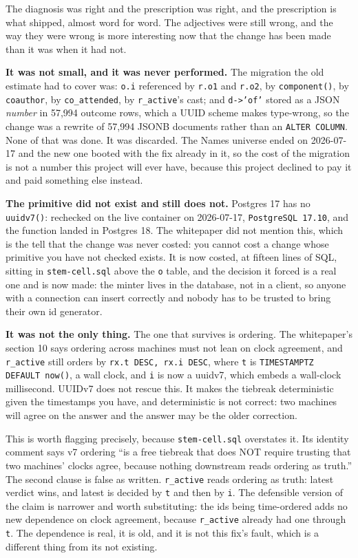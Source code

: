 The diagnosis was right and the prescription was right, and the prescription is what shipped, almost word for word. The adjectives were still wrong, and the way they were wrong is more interesting now that the change has been made than it was when it had not.

\textbf{It was not small, and it was never performed.} The migration the old estimate had to cover was: \texttt{o.i} referenced by \texttt{r.o1} and \texttt{r.o2}, by \texttt{component()}, by \texttt{coauthor}, by \texttt{co\_attended}, by \texttt{r\_active}'s cast; and \texttt{d->'of'} stored as a JSON \emph{number} in 57,994 outcome rows, which a UUID scheme makes type-wrong, so the change was a rewrite of 57,994 JSONB documents rather than an \texttt{ALTER COLUMN}. None of that was done. It was discarded. The Names universe ended on 2026-07-17 and the new one booted with the fix already in it, so the cost of the migration is not a number this project will ever have, because this project declined to pay it and paid something else instead.

\textbf{The primitive did not exist and still does not.} Postgres 17 has no \texttt{uuidv7()}: rechecked on the live container on 2026-07-17, \texttt{PostgreSQL 17.10}, and the function landed in Postgres 18. The whitepaper did not mention this, which is the tell that the change was never costed: you cannot cost a change whose primitive you have not checked exists. It is now costed, at fifteen lines of SQL, sitting in \texttt{stem-cell.sql} above the \texttt{o} table, and the decision it forced is a real one and is now made: the minter lives in the database, not in a client, so anyone with a connection can insert correctly and nobody has to be trusted to bring their own id generator.

\textbf{It was not the only thing.} The one that survives is ordering. The whitepaper's section 10 says ordering across machines must not lean on clock agreement, and \texttt{r\_active} still orders by \texttt{rx.t DESC, rx.i DESC}, where \texttt{t} is \texttt{TIMESTAMPTZ DEFAULT now()}, a wall clock, and \texttt{i} is now a uuidv7, which embeds a wall-clock millisecond. UUIDv7 does not rescue this. It makes the tiebreak deterministic given the timestamps you have, and deterministic is not correct: two machines will agree on the answer and the answer may be the older correction.

This is worth flagging precisely, because \texttt{stem-cell.sql} overstates it. Its identity comment says v7 ordering ``is a free tiebreak that does NOT require trusting that two machines' clocks agree, because nothing downstream reads ordering as truth.'' The second clause is false as written. \texttt{r\_active} reads ordering as truth: latest verdict wins, and latest is decided by \texttt{t} and then by \texttt{i}. The defensible version of the claim is narrower and worth substituting: the ids being time-ordered adds no new dependence on clock agreement, because \texttt{r\_active} already had one through \texttt{t}. The dependence is real, it is old, and it is not this fix's fault, which is a different thing from its not existing.

